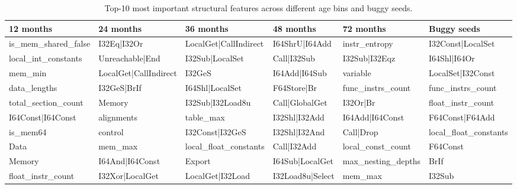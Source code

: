 \begin{table}[ht!]
\scriptsize
\centering
\begin{tabular}{l|l|l|l|l|l}
\hline
\textbf{12 months} & \textbf{24 months} & \textbf{36 months} & \textbf{48 months} & \textbf{72 months} & \textbf{Buggy seeds} \\ \hline
is\_mem\_shared\_false & I32Eq|I32Or & LocalGet|CallIndirect & I64ShrU|I64Add & instr\_entropy & I32Const|LocalSet \\
local\_int\_constants & Unreachable|End & I32Sub|LocalSet & Call|I32Sub & I32Sub|I32Eqz & I64Shl|I64Or \\
mem\_min & LocalGet|CallIndirect & I32GeS & I64Add|I64Sub & variable & LocalSet|I32Const \\
data\_lengths & I32GeS|BrIf & I64Shl|LocalSet & F64Store|Br & func\_instrs\_count & func\_instrs\_count \\
total\_section\_count & Memory & I32Sub|I32Load8u & Call|GlobalGet & I32Or|Br & float\_instr\_count \\
I64Const|I64Const & alignments & table\_max & I32Shl|I32Add & I64Add|I64Const & F64Const|F64Add \\
is\_mem64 & control & I32Const|I32GeS & I32Shl|I32And & Call|Drop & local\_float\_constants \\
Data & mem\_max & local\_float\_constants & Call|I32Add & local\_const\_count & F64Const \\
Memory & I64And|I64Const & Export & I64Sub|LocalGet & max\_nesting\_depths & BrIf \\
float\_instr\_count & I32Xor|LocalGet & LocalGet|I32Load & I32Load8u|Select & mem\_max & I32Sub \\
\hline
\end{tabular}
\caption{ Top-10 most important structural features across different age bins and buggy seeds.}

\label{tab:top_features}
\end{table}
